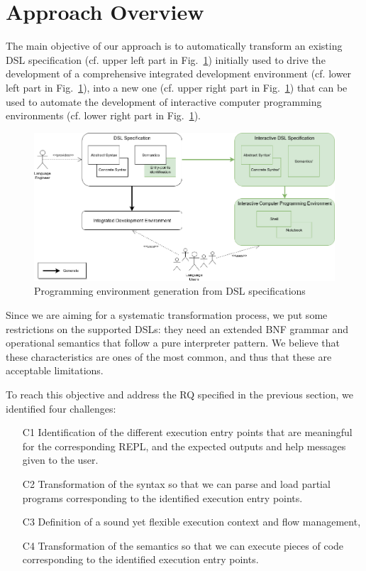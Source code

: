 \section{Approach Overview}
\label{approach}

The main objective of our approach is to automatically transform an existing DSL specification (cf. upper left part in Fig.~\ref{fig:overview}) initially used to drive the development of a comprehensive integrated development environment (cf. lower left part in Fig.~\ref{fig:overview}), into a new one (cf. upper right part in Fig.~\ref{fig:overview}) that can be used to automate the development of interactive computer programming environments (cf. lower right part in Fig.~\ref{fig:overview}). 
%
%
\begin{figure}[htb]
	\centering
	\includegraphics[width=0.7\linewidth]{figures/sle_overview.png}
	\caption{Programming environment generation from DSL specifications}
	\label{fig:overview}
\end{figure}
%

Since we are aiming for a systematic transformation process, we put some restrictions on the supported DSLs: they need an extended BNF grammar and operational semantics that follow a pure interpreter pattern.
We believe that these characteristics are ones of the most common, and thus that these are acceptable limitations.

To reach this objective and address the RQ specified in the previous section, we identified four challenges:
\begin{itemize}
\item[C1] Identification of the different execution entry points that are meaningful for the corresponding REPL, and the expected outputs and help messages given to the user. 
\item[C2] Transformation of the syntax so that we can parse and load partial programs corresponding to the identified execution entry points. 
\item[C3] Definition of a sound yet flexible execution context and flow management,
\item[C4] Transformation of the semantics so that we can execute pieces of code corresponding to the identified execution entry points.
\end{itemize}



